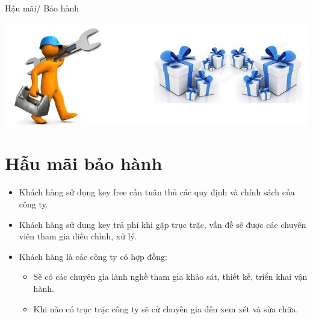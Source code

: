 \documentclass{beamer}
\begin{document}
\begin{frame}{Hậu mãi/ Bảo hành}
\begin{center}
\includegraphics[scale=0.5]{8.jpg}
\end{center}
\section{Hẫu mãi bảo hành}
\begin{itemize}
\item Khách hàng sử dụng key free cần tuân thủ các quy định và chính sách của công ty.

\item Khách hàng sử dụng key trả phí khi gặp trục trặc, vấn đề sẽ được các chuyên viên tham gia điều chỉnh, xử lý.

\item Khách hàng là các công ty có hợp đồng:
\begin{itemize}
\item Sẽ có các chuyên gia lành nghề tham gia khảo sát, thiết kế, triển khai vận hành.
\item Khi nào có trục trặc công ty sẽ cử chuyên gia đến xem xét và sửa chữa.
\end{itemize}
\end{itemize}
\end{frame}
\end{document}
